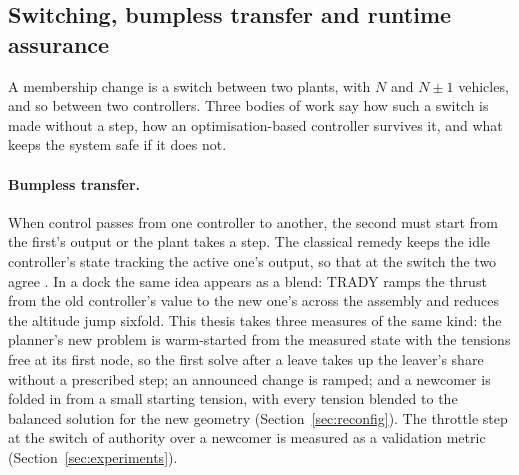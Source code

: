 
\subsection{Switching, bumpless transfer and runtime assurance}
\label{sec:lit_switching}

A membership change is a switch between two plants, with $N$ and $N \pm 1$ vehicles, and so between two
controllers. Three bodies of work say how such a switch is made without a step, how an optimisation-based
controller survives it, and what keeps the system safe if it does not.

\paragraph{Bumpless transfer.} When control passes from one controller to another, the second must start from
the first's output or the plant takes a step. The classical remedy keeps the idle controller's state tracking the
active one's output, so that at the switch the two agree \cite{graebe1996transfer, peng1996antiwindup}. In a dock the same idea appears as a blend: TRADY \cite{sugihara2023trady}
ramps the thrust from the old controller's value to the new one's across the assembly and reduces the altitude
jump sixfold. This thesis takes three measures of the same kind: the planner's new problem is warm-started from
the measured state with the tensions free at its first node, so the first solve after a leave takes up the
leaver's share without a prescribed step; an announced change is ramped; and a newcomer is folded in from a small
starting tension, with every tension blended to the balanced solution for the new geometry
(Section~\ref{sec:reconfig}). The throttle step at the switch of authority over a newcomer is measured as a
validation metric (Section~\ref{sec:experiments}).

